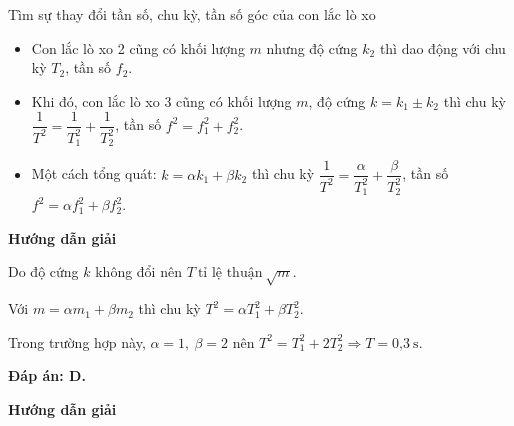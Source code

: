 \begin{dang}{Tìm sự thay đổi tần số, chu kỳ, tần số góc của con lắc lò xo}
{\begin{itemize}
\begin{itemize}
				\item Con lắc lò xo 2 cũng có khối lượng $m$ nhưng độ cứng $k_2$ thì dao động với chu kỳ $T_2$, tần số $f_2$.
				
				\item	Khi đó, con lắc lò xo 3 cũng có khối lượng $m$, độ cứng $k=k_1\pm k_2$ thì chu kỳ $\dfrac{1}{T^2}=\dfrac{1}{T_1^2}+\dfrac{1}{T_2^2}$, tần số  $f^2=f_1^2+f_2^2$.
				
				\item Một cách tổng quát: $k=\alpha k_1+\beta k_2$ thì chu kỳ $\dfrac{1}{T^2}=\dfrac{\alpha}{T_1^2}+\dfrac{\beta}{T_2^2}$, tần số  $f^2=\alpha f_1^2+\beta f_2^2$.
			\end{itemize}
		\end{itemize}
	}
	
	{\begin{center}
			\textbf{Hướng dẫn giải}
		\end{center}
		Do độ cứng $k$ không đổi nên $T \ \text{tỉ lệ thuận}\ \sqrt{m}$.
		
		Với $m=\alpha m_1+\beta m_2$ thì chu kỳ $T^2=\alpha T_1^2+\beta T_2^2$.
		
		Trong trường hợp này, $\alpha=1, \ \beta=2$ nên $T^2=T_1^2+2T_2^2\Rightarrow T=\text{0,3}\ \text{s}$.
		
		\textbf{Đáp án: D.}
	}
	{\begin{center}
			\textbf{Hướng dẫn giải}
		\end{center}
		
}
\end{dang}
